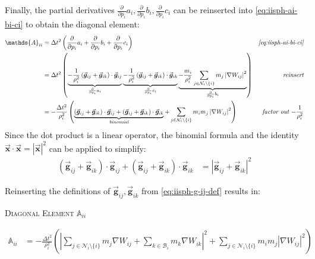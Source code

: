 \documentclass[oneside, a4paper]{book}
\newcommand{\equationnamed}[2]{%
  \setlength{\fboxsep}{2pt} %
  \setlength{\fboxrule}{0.01pt}
  \begin{center}
    \begin{minipage}{\textwidth}
      \begin{center}\textsc{#1}\end{center}
      #2
    \end{minipage}
  \end{center}
}
\newcommand\abs[1]{\left|#1\right|}
\newcommand\pdpi[0]{\frac{\partial}{\partial p_i}}
\newcommand\vek[1]{\vec{\bm{#1}}}
\newcommand\br[1]{\left(#1\right)}
\begin{document}
    Finally, the partial derivatives $\pdpi a_i, \pdpi b_i, \pdpi c_i$ can be reinserted into \autoref{eq:iisph-ai-bi-ci} to obtain the diagonal element:
    \begin{align*}
      \mathds{A}_{ii} &= \Delta t^2\br{\pdpi a_i + \pdpi b_i + \pdpi c_i}
      &\textit{\autoref{eq:iisph-ai-bi-ci}}\\
      &= \Delta t^2\br{
        \underbrace{
          -\frac{1}{\rho_i^2} \br{\vek{g}_{ij} +\vek{g}_{ik}} \cdot \vek{g}_{ij}
        }_{\pdpi a_i}
        \underbrace{
          -\frac{1}{\rho_i^2} \br{\vek{g}_{ij} +\vek{g}_{ik}} \cdot \vek{g}_{ik}
        }_{\pdpi c_i}
        \underbrace{
          - \frac{m_i}{\rho_i^2} \sum_{j\in\mathcal{N}_i\setminus \{i\}} m_j  \abs{\nabla W_{ij}}^2
        }_{\pdpi b_i}
      }
      &\textit{reinsert}\\
      &= -\frac{\Delta t^2}{\rho_i^2} \br{
        \underbrace{
          \br{\vek{g}_{ij} +\vek{g}_{ik}} \cdot \vek{g}_{ij}
          +
          \br{\vek{g}_{ij} +\vek{g}_{ik}} \cdot \vek{g}_{ik}
        }_{\textit{binomial}}
        + \sum_{j\in\mathcal{N}_i\setminus \{i\}} m_i m_j  \abs{\nabla W_{ij}}^2
      }&\textit{factor out $-\frac{1}{\rho_i^2}$}
    \end{align*}
    Since the dot product is a linear operator, the binomial formula and the identity $\vek{x} \cdot \vek{x} = \abs{\vek{x}}^2$ can be applied to simplify:
    \begin{align}
      \br{\vek{g}_{ij} +\vek{g}_{ik}} \cdot \vek{g}_{ij}
        +
      \br{\vek{g}_{ij} +\vek{g}_{ik}} \cdot \vek{g}_{ik}
      &= \abs{\vek{g}_{ij} +\vek{g}_{ik}}^2
    \end{align}
    
    Reinserting the definitions of $\vek{g}_{ij},\vek{g}_{ik}$ from \autoref{eq:iisph-g-ij-def} results in:

    \equationnamed{Diagonal Element $\mathds{A}_{ii}$}{
      \vspace{-0.5cm}
      \begin{align}
        \mathds{A}_{ii} &= -\frac{\Delta t^2}{\rho_i^2} \br{
          \abs{
            \sum_{j\in\mathcal{N}_i\setminus \{i\}}m_j \nabla W_{ij} + \sum_{k\in\mathcal{B}_i} m_k \nabla W_{ik}
          }^2 
          + \sum_{j\in\mathcal{N}_i\setminus \{i\}} m_i m_j  \abs{\nabla W_{ij}}^2
        }
        \label{eq:iisph-diagonal-element}
      \end{align}
    }
\end{document}
